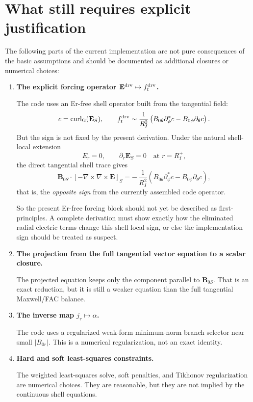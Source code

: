 \documentclass[11pt,a4paper]{article}
\begin{document}
\section{What still requires explicit justification}

The following parts of the current implementation are not pure consequences of
the basic assumptions and should be documented as additional closures or
numerical choices:

\begin{enumerate}
\item \textbf{The explicit forcing operator
$\mathbf E^{\rm drv} \mapsto f_t^{\rm drv}$.}

The code uses an Er-free shell operator built from the tangential field:
\[
c = \mathrm{curl}_\Omega(\mathbf E_S),
\qquad
f_t^{\rm drv}
\sim
\frac{1}{R_I^2}
\left(
B_{0\theta}\partial_\phi^\ast c - B_{0\phi}\partial_\theta c
\right).
\]
But the sign is not fixed by the present derivation. Under the natural
shell-local extension
\[
E_r = 0,
\qquad
\partial_r \mathbf E_S = 0
\quad\text{at } r=R_I^+,
\]
the direct tangential shell trace gives
\[
\mathbf B_{0S}\cdot[-\nabla\times\nabla\times \mathbf E]_S
=
-\,\frac{1}{R_I^2}
\left(
B_{0\theta}\partial_\phi^\ast c - B_{0\phi}\partial_\theta c
\right),
\]
that is, the \emph{opposite sign} from the currently assembled code operator.

So the present Er-free forcing block should not yet be described as
first-principles. A complete derivation must show exactly how the eliminated
radial-electric terms change this shell-local sign, or else the implementation
sign should be treated as suspect.

\item \textbf{The projection from the full tangential vector equation to a
scalar closure.}

The projected equation keeps only the component parallel to $\mathbf B_{0S}$.
That is an exact reduction, but it is still a weaker equation than the full
tangential Maxwell/FAC balance.

\item \textbf{The inverse map $j_r \mapsto \alpha$.}

The code uses a regularized weak-form minimum-norm branch selector near small
$|B_{0r}|$. This is a numerical regularization, not an exact identity.

\item \textbf{Hard and soft least-squares constraints.}

The weighted least-squares solve, soft penalties, and Tikhonov regularization
are numerical choices. They are reasonable, but they are not implied by the
continuous shell equations.


\end{enumerate}
\end{document}
